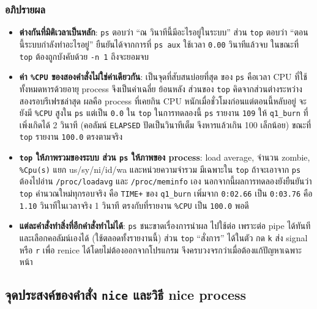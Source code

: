 \documentclass[a4paper,11pt]{article}
\newcommand{\code}[1]{\texttt{#1}}
\begin{document}
\subsubsection{อภิปรายผล}

\begin{itemize}[leftmargin=*]
  \item \textbf{ต่างกันที่มิติเวลาเป็นหลัก}: \code{ps} ตอบว่า ``ณ วินาทีนี้มีอะไรอยู่ในระบบ''
        ส่วน \code{top} ตอบว่า ``ตอนนี้ระบบกำลังทำอะไรอยู่'' ยืนยันได้จากการที่
        \code{ps aux} ใช้เวลา \code{0.00} วินาทีแล้วจบ ในขณะที่ \code{top}
        ต้องถูกบังคับด้วย \code{-n 1} ถึงจะยอมจบ

  \item \textbf{ค่า \code{\%CPU} ของสองคำสั่งไม่ใช่ค่าเดียวกัน}: เป็นจุดที่สับสนบ่อยที่สุด
        ของ \code{ps} คือเวลา CPU ที่ใช้ทั้งหมดหารด้วยอายุ process จึงเป็นค่าเฉลี่ย
        ย้อนหลัง ส่วนของ \code{top} คิดจากส่วนต่างระหว่างสองรอบรีเฟรชล่าสุด
        ผลคือ process ที่เคยกิน CPU หนักเมื่อชั่วโมงก่อนแต่ตอนนี้หลับอยู่
        จะยังมี \code{\%CPU} สูงใน \code{ps} แต่เป็น \code{0.0} ใน \code{top}
        ในการทดลองนี้ \code{ps} รายงาน \code{109} ให้ \code{q1\_burn} ที่เพิ่งเกิดได้
        2 วินาที (คอลัมน์ \code{ELAPSED} ปัดเป็นวินาทีเต็ม จึงหารแล้วเกิน 100 เล็กน้อย)
        ขณะที่ \code{top} รายงาน \code{100.0} ตรงตามจริง

  \item \textbf{\code{top} ให้ภาพรวมของระบบ ส่วน \code{ps} ให้ภาพของ process}:
        load average, จำนวน zombie, \code{\%Cpu(s)} แยก us/sy/ni/id/wa และหน่วยความจำรวม
        มีเฉพาะใน \code{top} ถ้าจะเอาจาก \code{ps} ต้องไปอ่าน \code{/proc/loadavg}
        และ \code{/proc/meminfo} เอง นอกจากนี้ผลการทดลองยังยืนยันว่า \code{top}
        คำนวณใหม่ทุกรอบจริง คือ \code{TIME+} ของ \code{q1\_burn} เพิ่มจาก
        \code{0:02.66} เป็น \code{0:03.76} คือ \code{1.10} วินาทีในเวลาจริง 1 วินาที
        ตรงกับที่รายงาน \code{\%CPU} เป็น \code{100.0} พอดี

  \item \textbf{แต่ละคำสั่งทำสิ่งที่อีกคำสั่งทำไม่ได้}: \code{ps} ชนะขาดเรื่องการนำผล
        ไปใช้ต่อ เพราะต่อ pipe ได้ทันทีและเลือกคอลัมน์เองได้ (ใช้ตลอดทั้งรายงานนี้)
        ส่วน \code{top} ``สั่งการ'' ได้ในตัว กด \code{k} ส่ง signal หรือ \code{r}
        เพื่อ renice ได้โดยไม่ต้องออกจากโปรแกรม จึงครบวงจรกว่าเมื่อต้องแก้ปัญหาเฉพาะหน้า
\end{itemize}

\subsection{จุดประสงค์ของคำสั่ง \code{nice} และวิธี nice process}
\end{document}

